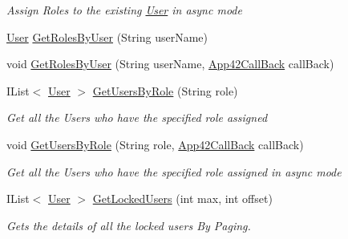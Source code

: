 \begin{DoxyCompactItemize}
\begin{DoxyCompactList}\small\item\em Assign Roles to the existing \hyperlink{classcom_1_1shephertz_1_1app42_1_1paas_1_1sdk_1_1csharp_1_1user_1_1_user}{User} in async mode \end{DoxyCompactList}\item 
\hyperlink{classcom_1_1shephertz_1_1app42_1_1paas_1_1sdk_1_1csharp_1_1user_1_1_user}{User} \hyperlink{classcom_1_1shephertz_1_1app42_1_1paas_1_1sdk_1_1csharp_1_1user_1_1_user_service_aa9e47b323aa11a9a1d4224fd5899db05}{Get\+Roles\+By\+User} (String user\+Name)
\item 
void \hyperlink{classcom_1_1shephertz_1_1app42_1_1paas_1_1sdk_1_1csharp_1_1user_1_1_user_service_a967c985f2ae5bffc3f96cd794c4ec0af}{Get\+Roles\+By\+User} (String user\+Name, \hyperlink{interfacecom_1_1shephertz_1_1app42_1_1paas_1_1sdk_1_1csharp_1_1_app42_call_back}{App42\+Call\+Back} call\+Back)
\item 
I\+List$<$ \hyperlink{classcom_1_1shephertz_1_1app42_1_1paas_1_1sdk_1_1csharp_1_1user_1_1_user}{User} $>$ \hyperlink{classcom_1_1shephertz_1_1app42_1_1paas_1_1sdk_1_1csharp_1_1user_1_1_user_service_a34a4a1f0875053831894816557d2eb91}{Get\+Users\+By\+Role} (String role)
\begin{DoxyCompactList}\small\item\em Get all the Users who have the specified role assigned \end{DoxyCompactList}\item 
void \hyperlink{classcom_1_1shephertz_1_1app42_1_1paas_1_1sdk_1_1csharp_1_1user_1_1_user_service_af6a87498006b04c3d74e96a1613a1d8c}{Get\+Users\+By\+Role} (String role, \hyperlink{interfacecom_1_1shephertz_1_1app42_1_1paas_1_1sdk_1_1csharp_1_1_app42_call_back}{App42\+Call\+Back} call\+Back)
\begin{DoxyCompactList}\small\item\em Get all the Users who have the specified role assigned in async mode \end{DoxyCompactList}\item 
I\+List$<$ \hyperlink{classcom_1_1shephertz_1_1app42_1_1paas_1_1sdk_1_1csharp_1_1user_1_1_user}{User} $>$ \hyperlink{classcom_1_1shephertz_1_1app42_1_1paas_1_1sdk_1_1csharp_1_1user_1_1_user_service_a853298127a1b9114d6c5ef8ed4def372}{Get\+Locked\+Users} (int max, int offset)
\begin{DoxyCompactList}\small\item\em Gets the details of all the locked users By Paging. \end{DoxyCompactList}\item 

\end{DoxyCompactItemize}
